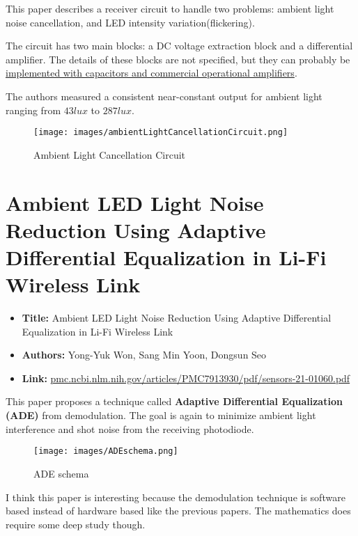 \documentclass[a4paper,12pt,twoside]{article}
\begin{document}
	This paper describes a receiver circuit to handle two problems: ambient light noise cancellation, and LED intensity variation(flickering). 

	The circuit has two main blocks: a DC voltage extraction block and a differential amplifier. The details of these blocks are not specified, but they can probably be \href{https://electronics.stackexchange.com/questions/188487/circuit-to-remove-dc-and-extract-ac-signal}{implemented with capacitors and commercial operational amplifiers}.
	
	The authors measured a consistent near-constant output for ambient light ranging from $43lux$ to $287lux$.
	
	\begin{figure}[h]
		\centering
		\texttt{[image: images/ambientLightCancellationCircuit.png]}
		\caption{Ambient Light Cancellation Circuit}
	\end{figure}
	
	\section{Ambient LED Light Noise Reduction Using Adaptive Differential Equalization in Li-Fi Wireless Link}
	\begin{tcolorbox}
		\begin{itemize}
			\item \textbf{Title:} Ambient LED Light Noise Reduction Using Adaptive Differential Equalization in Li-Fi Wireless Link
			\item \textbf{Authors:} Yong-Yuk Won, Sang Min Yoon, Dongsun Seo
			\item \textbf{Link:} \href{https://pmc.ncbi.nlm.nih.gov/articles/PMC7913930/pdf/sensors-21-01060.pdf}{pmc.ncbi.nlm.nih.gov/articles/PMC7913930/pdf/sensors-21-01060.pdf}
		\end{itemize}
	\end{tcolorbox}
	
	This paper proposes a technique called \textbf{Adaptive Differential Equalization (ADE)} from demodulation. The goal is again to minimize ambient light interference and shot noise from the receiving photodiode.
	
	\begin{figure}[h]
		\centering
		\texttt{[image: images/ADEschema.png]}
		\caption{ADE schema}
	\end{figure}
	
	I think this paper is interesting because the demodulation technique is software based instead of hardware based like the previous papers. The mathematics does require some deep study though.
	
\end{document}
